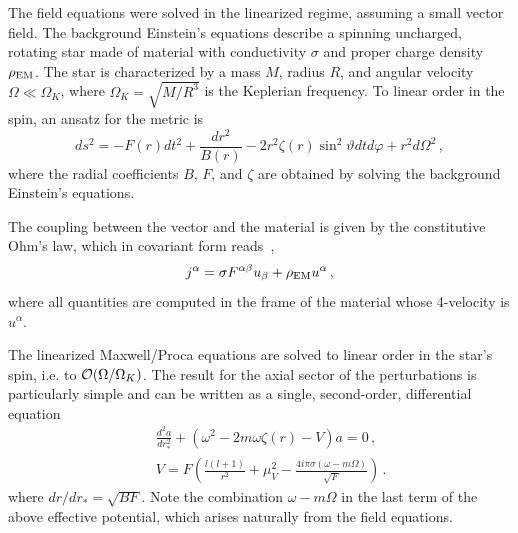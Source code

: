 \documentclass[11pt]{article}
\newcommand{\be}{\begin{equation}}
\newcommand{\ee}{\end{equation}}
\def\beq{\begin{eqnarray}}
\def\eeq{\end{eqnarray}}
\numberwithin{equation}{section} %
\begin{document}
The field equations were solved in the linearized regime, assuming a small vector field. The background Einstein's 
equations describe a spinning uncharged, rotating star made of material with conductivity $\sigma$ and proper charge 
density $\rho_{\rm EM}$. The star is characterized by a mass $M$, radius $R$, and angular velocity 
$\Omega\ll \Omega_K$, where $\Omega_K=\sqrt{M/R^3}$ is the Keplerian frequency.
%
To linear order in the spin, an ansatz for the metric is
\begin{equation}
ds^2=-F(r) dt^2+\frac{dr^2}{B(r)}-2r^2 \zeta(r) \sin^2\vartheta dt d\varphi 
+r^2d\Omega^2\,,
\end{equation}
%
where the radial coefficients $B$, $F$, and $\zeta$ are obtained by solving the background 
Einstein's equations.

The coupling between the vector and the material is given by the constitutive Ohm's law, which 
in covariant form reads~\cite{Bekenstein:1998nt},
%
\be
j^{\alpha}=\sigma F^{\alpha\beta} u_{\beta} +\rho_{\rm EM} u^\alpha\,,
\label{eq:conductivitycurrent}
\ee
%
where all quantities are computed in the frame of the material whose 4-velocity is $u^{\alpha}$. 

The linearized Maxwell/Proca equations are solved to linear order in the star's spin, i.e. to ${\cal 
O}(\Omega/\Omega_K)$. The result for the axial sector of the perturbations is particularly simple and can be written 
as a single, second-order, differential equation
%
\beq
&&\frac{d^2 a}{dr_*^2}+\left(\omega^2-2m\omega\zeta(r)-V\right)a=0\,, \label{axial_final}\\
%
&&V=F\left(\frac{l(l+1)}{r^2}+\mu_V^2-\frac{4i\pi\sigma (\omega-m\Omega)}{\sqrt{F}}\right)\,.
\eeq
%
where $dr/dr_*=\sqrt{BF}$. Note the combination $\omega-m\Omega$ in the last term of the 
above effective potential, which arises 
naturally from the field equations. 
\end{document}
